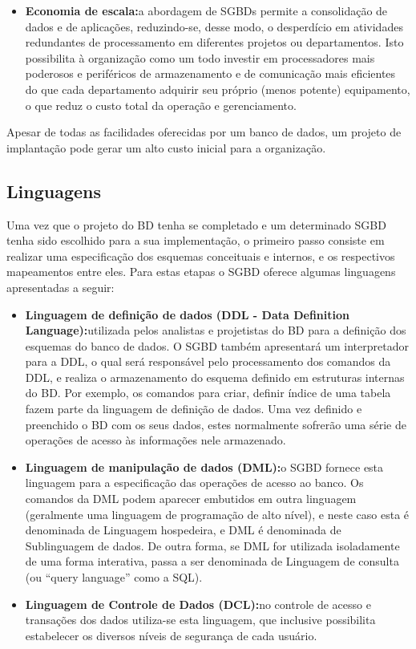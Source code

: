 \documentclass{article}
\begin{document}
\begin{itemize}
    \item \textbf{Economia de escala:}a abordagem de SGBDs permite a consolidação de dados e de aplicações, reduzindo-se, desse modo, o desperdício em atividades redundantes de processamento em diferentes projetos ou departamentos. Isto possibilita à organização como um todo investir em processadores mais poderosos e periféricos de armazenamento e de comunicação mais eficientes do que cada departamento adquirir seu próprio (menos potente) equipamento, o que reduz o custo total da operação e gerenciamento.
\end{itemize}
Apesar de todas as facilidades oferecidas por um banco de dados, um projeto de implantação pode gerar um alto custo inicial para a organização.


\subsection*{Linguagens}
Uma vez que o projeto do BD tenha se completado e um determinado SGBD tenha sido escolhido para a sua implementação, o primeiro passo consiste em realizar uma especificação dos esquemas conceituais e internos, e os respectivos mapeamentos entre eles. Para estas etapas o SGBD oferece algumas linguagens apresentadas a seguir:
\begin{itemize}
    \item \textbf{Linguagem de definição de dados (DDL - Data Definition Language):}utilizada pelos analistas e projetistas do BD para a definição dos esquemas do banco de dados. O SGBD também apresentará um interpretador para a DDL, o qual será responsável pelo processamento dos comandos da DDL, e realiza o armazenamento do esquema definido em estruturas internas do BD. Por exemplo, os comandos para criar, definir índice de uma tabela fazem parte da linguagem de definição de dados. Uma vez definido e preenchido o BD com os seus dados, estes normalmente sofrerão uma série de operações de acesso às informações nele armazenado.
    \item \textbf{Linguagem de manipulação de dados (DML):}o SGBD fornece esta linguagem para a especificação das operações de acesso ao banco. Os comandos da DML podem aparecer embutidos em outra linguagem (geralmente uma linguagem de programação de alto nível), e neste caso esta é denominada de Linguagem hospedeira, e DML é denominada de Sublinguagem de dados. De outra forma, se DML for utilizada isoladamente de uma forma interativa, passa a ser denominada de Linguagem de consulta (ou “query language” como a SQL).
    \item \textbf{Linguagem de Controle de Dados (DCL):}no controle de acesso e transações dos dados utiliza-se esta linguagem, que inclusive possibilita estabelecer os diversos níveis de segurança de cada usuário.
\end{itemize}
\end{document}
